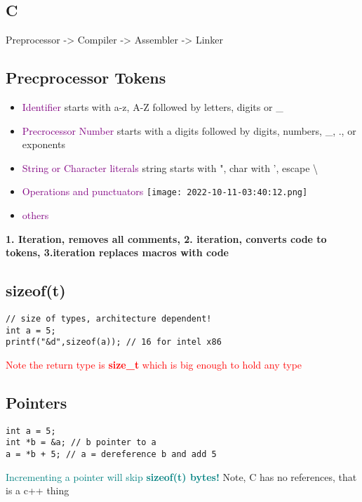\documentclass[main.tex,fontsize=8pt,paper=a4,paper=landscape,DIV=calc,]{scrartcl}
\begin{document}
\begin{multicols*}{4}
\lstset{
    language=c,
    style=code,
}
\section{C}
Preprocessor -> Compiler -> Assembler -> Linker

\subsection{Precprocessor Tokens}
\begin{itemize}
\item \textcolor{purple}{Identifier}\newline
starts with a-z, A-Z followed by letters, digits or \_
\item \textcolor{purple}{Precrocessor Number}\newline
  starts with a digits followed by digits, numbers, \_, ., or exponents
\item \textcolor{purple}{String or Character literals}\newline
  string starts with ", char with ', escape \textbackslash 
\item \textcolor{purple}{Operations and punctuators}\newline
  \texttt{[image: 2022-10-11-03:40:12.png]}
\item \textcolor{purple}{others}
\end{itemize} 

\textbf{1. Iteration, removes all comments, 2. iteration, converts code to tokens, 3.iteration replaces macros with code}

\subsection{sizeof(t)}
\begin{lstlisting}
// size of types, architecture dependent!
int a = 5;
printf("&d",sizeof(a)); // 16 for intel x86
\end{lstlisting}
\vspace{2mm}
\textcolor{red}{Note the return type is \textbf{size\_t} which is big enough to hold any type}

\subsection{Pointers}
\begin{lstlisting}
int a = 5;
int *b = &a; // b pointer to a 
a = *b + 5; // a = dereference b and add 5
\end{lstlisting}
\vspace{2mm}
\textcolor{teal}{Incrementing a pointer will skip \textbf{sizeof(t) bytes!}}
Note, C has no references, that is a c++ thing


\end{multicols*}
\end{document}
